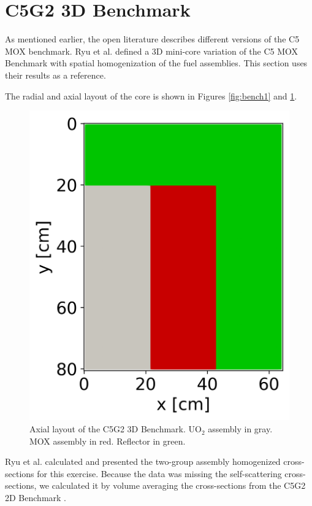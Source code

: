 \documentclass{anstrans}
\begin{document}


\section{C5G2 3D Benchmark}

As mentioned earlier, the open literature describes different versions of the C5 MOX benchmark.
Ryu et al. \cite{ryu_finite_2013} defined a 3D mini-core variation of the C5 MOX Benchmark with spatial homogenization of the fuel assemblies.
This section uses their results as a reference.

The radial and axial layout of the core is shown in Figures \ref{fig:bench1} and \ref{fig:c5g2-3d}.

\begin{figure}[h] %
    \centering
    \includegraphics[width=0.5\linewidth]{figures/geo-xz2.png}
    \hfill
    \caption{Axial layout of the C5G2 3D Benchmark. UO$_2$ assembly in gray. MOX assembly in red. Reflector in green.}
    \label{fig:c5g2-3d}
\end{figure}

Ryu et al. calculated and presented the two-group assembly homogenized cross-sections for this exercise.
Because the data was missing the self-scattering cross-sections, we calculated it by volume averaging the cross-sections from the C5G2 2D Benchmark \cite{cavarec_benchmark_1994}.
\end{document}
